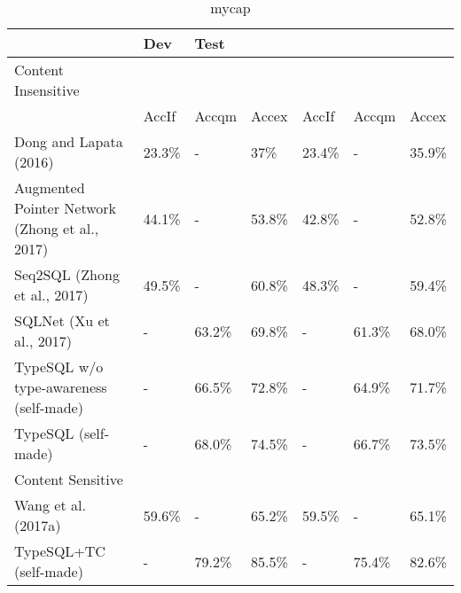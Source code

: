 \begin{table}[!ht]
    \centering
    \begin{tabular}{|l|l|l|}
        \hline

                                                       & Dev    & Test                                       \\ \hline
        Content Insensitive                                                                                  \\ \hline

                                                       & AccIf  & Accqm  & Accex  & AccIf  & Accqm  & Accex  \\ \hline
        Dong and Lapata (2016)                         & 23.3\% & -      & 37\%   & 23.4\% & -      & 35.9\% \\ \hline
        Augmented Pointer Network (Zhong et al., 2017) & 44.1\% & -      & 53.8\% & 42.8\% & -      & 52.8\% \\ \hline
        Seq2SQL (Zhong et al., 2017)                   & 49.5\% & -      & 60.8\% & 48.3\% & -      & 59.4\% \\ \hline
        SQLNet (Xu et al., 2017)                       & -      & 63.2\% & 69.8\% & -      & 61.3\% & 68.0\% \\ \hline
        TypeSQL w/o type-awareness (self-made)         & -      & 66.5\% & 72.8\% & -      & 64.9\% & 71.7\% \\ \hline
        TypeSQL (self-made)                            & -      & 68.0\% & 74.5\% & -      & 66.7\% & 73.5\% \\ \hline
        Content Sensitive                                                                                    \\ \hline
        Wang et al. (2017a)                            & 59.6\% & -      & 65.2\% & 59.5\% & -      & 65.1\% \\ \hline
        TypeSQL+TC (self-made)                         & -      & 79.2\% & 85.5\% & -      & 75.4\% & 82.6\% \\ \hline
    \end{tabular}
    \caption{mycap}
    \label{mylabel}
\end{table}


